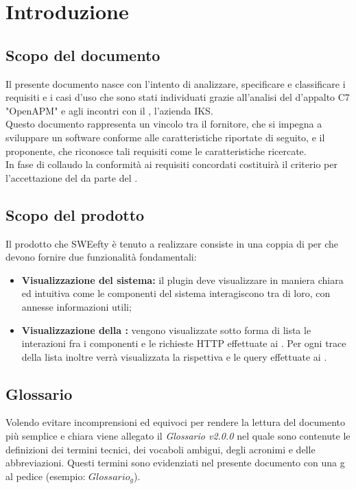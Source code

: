 \section{Introduzione} \label{intro}
	\subsection{Scopo del documento}
	Il presente documento nasce con l'intento di analizzare, specificare e classificare i requisiti e i casi d'uso che sono stati individuati grazie all'analisi del  d'appalto C7 "OpenAPM" e agli incontri con il , l'azienda IKS.\\
	Questo documento rappresenta un vincolo tra il fornitore, che si impegna a sviluppare un software conforme alle caratteristiche riportate di seguito, e il proponente, che riconosce tali requisiti come le caratteristiche ricercate.\\
	In fase di collaudo la conformità ai requisiti concordati costituirà il criterio per l'accettazione del  da parte del .

	\subsection{Scopo del prodotto}
	Il prodotto che SWEefty è tenuto a realizzare consiste in una coppia di  per  che devono fornire due funzionalità fondamentali:
	\begin{itemize}
		\item \textbf{Visualizzazione  del sistema:} il plugin deve visualizzare in maniera chiara ed intuitiva come le componenti del sistema interagiscono tra di loro, con annesse informazioni utili;
		\item \textbf{Visualizzazione della :} vengono visualizzate sotto forma di lista le interazioni fra i componenti e le richieste HTTP effettuate ai . Per ogni trace della lista inoltre verrà visualizzata la rispettiva  e le query effettuate ai .
	\end{itemize}

	\subsection{Glossario}
		Volendo evitare incomprensioni  ed equivoci per rendere la lettura del documento più semplice e chiara viene allegato il \emph{Glossario v2.0.0} nel quale sono contenute le definizioni dei termini tecnici, dei vocaboli ambigui, degli acronimi e delle abbreviazioni. Questi termini sono evidenziati nel presente documento con una g al pedice (esempio: $Glossario_{g}$).
